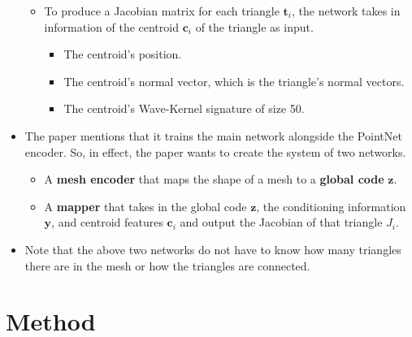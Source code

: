 \documentclass[10pt]{article}
\newcommand{\ve}[1]{\mathbf{#1}}
\begin{document}
\begin{itemize}
\begin{itemize}
        \item To produce a Jacobian matrix for each triangle $\ve{t}_i$, the network takes in information of the centroid $\ve{c}_i$ of the triangle as input.
        \begin{itemize}
            \item The centroid's position.
            \item The centroid's normal vector, which is the triangle's normal vectors.
            \item The centroid's Wave-Kernel signature of size 50.
        \end{itemize}
    \end{itemize}

    \item The paper mentions that it trains the main network alongside the PointNet encoder. So, in effect, the paper wants to create the system of two networks.
    \begin{itemize}
        \item A {\bf mesh encoder} that maps the shape of a mesh to a {\bf global code} $\ve{z}$.
        \item A {\bf mapper} that takes in the global code $\ve{z}$, the conditioning information $\ve{y}$, and centroid features $\ve{c}_i$ and output the Jacobian of that triangle $J_i$.
    \end{itemize}

    \item Note that the above two networks do not have to know how many triangles there are in the mesh or how the triangles are connected.
\end{itemize}

\section{Method}
\end{document}
